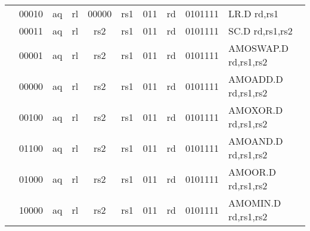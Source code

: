 \begin{table}[p]
\begin{small}
\begin{center}
\begin{tabular}{p{0in}p{0.4in}p{0.05in}p{0.05in}p{0.05in}p{0.05in}p{0.4in}p{0.6in}p{0.4in}p{0.6in}p{0.7in}l}
&
\multicolumn{2}{|c|}{00010} &
\multicolumn{1}{c|}{aq} &
\multicolumn{1}{c|}{rl} &
\multicolumn{2}{c|}{00000} &
\multicolumn{1}{c|}{rs1} &
\multicolumn{1}{c|}{011} &
\multicolumn{1}{c|}{rd} &
\multicolumn{1}{c|}{0101111} & LR.D rd,rs1 \\
\cline{2-11}
  

&
\multicolumn{2}{|c|}{00011} &
\multicolumn{1}{c|}{aq} &
\multicolumn{1}{c|}{rl} &
\multicolumn{2}{c|}{rs2} &
\multicolumn{1}{c|}{rs1} &
\multicolumn{1}{c|}{011} &
\multicolumn{1}{c|}{rd} &
\multicolumn{1}{c|}{0101111} & SC.D rd,rs1,rs2 \\
\cline{2-11}
  

&
\multicolumn{2}{|c|}{00001} &
\multicolumn{1}{c|}{aq} &
\multicolumn{1}{c|}{rl} &
\multicolumn{2}{c|}{rs2} &
\multicolumn{1}{c|}{rs1} &
\multicolumn{1}{c|}{011} &
\multicolumn{1}{c|}{rd} &
\multicolumn{1}{c|}{0101111} & AMOSWAP.D rd,rs1,rs2 \\
\cline{2-11}
  

&
\multicolumn{2}{|c|}{00000} &
\multicolumn{1}{c|}{aq} &
\multicolumn{1}{c|}{rl} &
\multicolumn{2}{c|}{rs2} &
\multicolumn{1}{c|}{rs1} &
\multicolumn{1}{c|}{011} &
\multicolumn{1}{c|}{rd} &
\multicolumn{1}{c|}{0101111} & AMOADD.D rd,rs1,rs2 \\
\cline{2-11}
  

&
\multicolumn{2}{|c|}{00100} &
\multicolumn{1}{c|}{aq} &
\multicolumn{1}{c|}{rl} &
\multicolumn{2}{c|}{rs2} &
\multicolumn{1}{c|}{rs1} &
\multicolumn{1}{c|}{011} &
\multicolumn{1}{c|}{rd} &
\multicolumn{1}{c|}{0101111} & AMOXOR.D rd,rs1,rs2 \\
\cline{2-11}
  

&
\multicolumn{2}{|c|}{01100} &
\multicolumn{1}{c|}{aq} &
\multicolumn{1}{c|}{rl} &
\multicolumn{2}{c|}{rs2} &
\multicolumn{1}{c|}{rs1} &
\multicolumn{1}{c|}{011} &
\multicolumn{1}{c|}{rd} &
\multicolumn{1}{c|}{0101111} & AMOAND.D rd,rs1,rs2 \\
\cline{2-11}
  

&
\multicolumn{2}{|c|}{01000} &
\multicolumn{1}{c|}{aq} &
\multicolumn{1}{c|}{rl} &
\multicolumn{2}{c|}{rs2} &
\multicolumn{1}{c|}{rs1} &
\multicolumn{1}{c|}{011} &
\multicolumn{1}{c|}{rd} &
\multicolumn{1}{c|}{0101111} & AMOOR.D rd,rs1,rs2 \\
\cline{2-11}
  

&
\multicolumn{2}{|c|}{10000} &
\multicolumn{1}{c|}{aq} &
\multicolumn{1}{c|}{rl} &
\multicolumn{2}{c|}{rs2} &
\multicolumn{1}{c|}{rs1} &
\multicolumn{1}{c|}{011} &
\multicolumn{1}{c|}{rd} &
\multicolumn{1}{c|}{0101111} & AMOMIN.D rd,rs1,rs2 \\
\cline{2-11}
  


\end{tabular}
\end{center}
\end{small}
\end{table}
